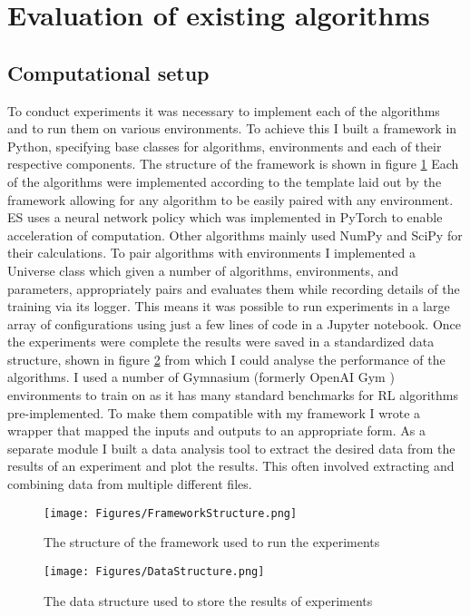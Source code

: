\section{Evaluation of existing algorithms}

\subsection{Computational setup}
\label{sec:AlgComp}
To conduct experiments it was necessary to implement each of the algorithms and to run them on various environments. To achieve this I built a framework in Python, specifying base classes for algorithms, environments and each of their respective components. The structure of the framework is shown in figure \ref{fig:CodeStructure} Each of the algorithms were implemented according to the template laid out by the framework allowing for any algorithm to be easily paired with any environment. ES uses a neural network policy which was implemented in PyTorch \cite{PyTorch} to enable acceleration of computation. Other algorithms mainly used NumPy \cite{NumPy} and SciPy \cite{SciPy} for their calculations. To pair algorithms with environments I implemented a Universe class which given a number of algorithms, environments, and parameters, appropriately pairs and evaluates them while recording details of the training via its logger. This means it was possible to run experiments in a large array of configurations using just a few lines of code in a Jupyter notebook. Once the experiments were complete the results were saved in a standardized data structure, shown in figure \ref{fig:DataStructure} from which I could analyse the performance of the algorithms. I used a number of Gymnasium (formerly OpenAI Gym \cite{Gym}) environments to train on as it has many standard benchmarks for RL algorithms pre-implemented. To make them compatible with my framework I wrote a wrapper that mapped the inputs and outputs to an appropriate form.
As a separate module I built a data analysis tool to extract the desired data from the results of an experiment and plot the results. This often involved extracting and combining data from multiple different files.

\begin{figure}
    \centering
    \texttt{[image: Figures/FrameworkStructure.png]}
    \caption{The structure of the framework used to run the experiments}
    \label{fig:CodeStructure}
\end{figure}

\begin{figure}
    \centering
    \texttt{[image: Figures/DataStructure.png]}
    \caption{The data structure used to store the results of experiments}
    \label{fig:DataStructure}
\end{figure}

